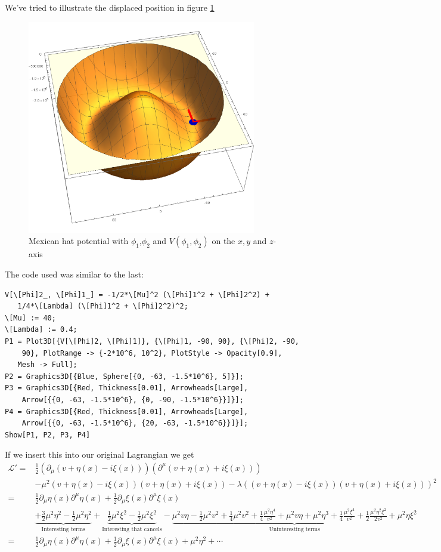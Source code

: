 \documentclass[a4,10pt,titlepage]{article}
\renewcommand\[{\begin{equation*}}
\renewcommand\]{\end{equation*}}
\numberwithin{equation}{section}
\newcommand{\lp}{\left}
\newcommand{\rp}{\right}
\newcommand{\Lar}{\mathscr{L}}
\newcommand{\half}{\frac{1}{2}}
\begin{document}
We've tried to illustrate the displaced position in figure \ref{fig:my_label2}
\begin{figure}[htb]
    \centering
    \includegraphics[width=10cm]{mexican_hat2.png}
    \caption{Mexican hat potential with $\phi_1$,$\phi_2$ and $V(\phi_1,\phi_2)$ on the $x,y$ and $z$-axis}
    \label{fig:my_label2}
\end{figure}
The code used was similar to the last:
\begin{lstlisting}
V[\[Phi]2_, \[Phi]1_] = -1/2*\[Mu]^2 (\[Phi]1^2 + \[Phi]2^2) + 
   1/4*\[Lambda] (\[Phi]1^2 + \[Phi]2^2)^2;
\[Mu] := 40;
\[Lambda] := 0.4;
P1 = Plot3D[{V[\[Phi]2, \[Phi]1]}, {\[Phi]1, -90, 90}, {\[Phi]2, -90, 
    90}, PlotRange -> {-2*10^6, 10^2}, PlotStyle -> Opacity[0.9], 
   Mesh -> Full];
P2 = Graphics3D[{Blue, Sphere[{0, -63, -1.5*10^6}, 5]}];
P3 = Graphics3D[{Red, Thickness[0.01], Arrowheads[Large], 
    Arrow[{{0, -63, -1.5*10^6}, {0, -90, -1.5*10^6}}]}];
P4 = Graphics3D[{Red, Thickness[0.01], Arrowheads[Large], 
    Arrow[{{0, -63, -1.5*10^6}, {20, -63, -1.5*10^6}}]}];
Show[P1, P2, P3, P4]
\end{lstlisting}
If we insert this into our original Lagrangian we get
\begin{align*}
\Lar'=&\frac{1}{2}\lp(\partial_\mu\lp(v+\eta(x)-i\xi(x)\rp)\rp)\lp(\partial^\mu\lp(v+\eta(x)+i\xi(x)\rp)\rp)\\
&-\mu^2\lp(v+\eta(x)-i\xi(x)\rp)\lp(v+\eta(x)+i\xi(x)\rp)-\lambda\lp(\lp(v+\eta(x)-i\xi(x)\rp)\lp(v+\eta(x)+i\xi(x)\rp) \rp)^2
\\
=&\half\partial_\mu\eta(x)\partial^\mu\eta(x)+\half\partial_\mu\xi(x)\partial^\mu\xi(x)\\
&\underbrace{+\frac{3}{2}\mu^2\eta^2-\half\mu^2\eta^2}_{\text{Interesting terms}}+\underbrace{\half\mu^2\xi^2-\half\mu^2\xi^2}_{\text{Interesting that cancels}}-\underbrace{\mu^2 v\eta-\half\mu^2v^2+\frac{1}{4}\mu^2v^2+\frac{1}{4}\frac{\mu^2\eta^4}{v^2}+\mu^2v\eta+\mu^2\eta^3+\frac{1}{4}\frac{\mu^2\xi^4}{v^2}+\frac{1}{2}\frac{\mu^2\eta^2\xi^2}{2v^2}+\mu^2\eta\xi^2}_{\text{Uninteresting terms}}\\
=&\half\partial_\mu\eta(x)\partial^\mu\eta(x)+\half\partial_\mu\xi(x)\partial^\mu\xi(x)+\mu^2\eta^2+\cdots
\end{align*}
\end{document}
